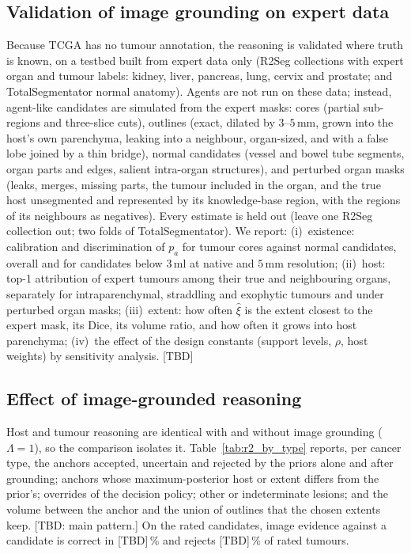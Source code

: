 \documentclass[fleqn,10pt]{olplainarticle}
\begin{document}
\subsection{Validation of image grounding on expert data}
\label{sec:results_expert}
Because TCGA has no tumour annotation, the reasoning is validated where truth is known, on a testbed built from expert
data only (R2Seg collections with expert organ and tumour labels: kidney, liver, pancreas, lung, cervix and prostate; and
TotalSegmentator normal anatomy). Agents are not run on these data; instead, agent-like candidates are simulated from the
expert masks: cores (partial sub-regions and three-slice cuts), outlines (exact, dilated by $3$--$5$\,mm, grown into the
host's own parenchyma, leaking into a neighbour, organ-sized, and with a false lobe joined by a thin bridge), normal
candidates (vessel and bowel tube segments, organ parts and edges, salient intra-organ structures), and perturbed organ
masks (leaks, merges, missing parts, the tumour included in the organ, and the true host unsegmented and represented by
its knowledge-base region, with the regions of its neighbours as negatives). Every estimate is held out (leave one R2Seg
collection out; two folds of TotalSegmentator). We report: (i)~existence: calibration and discrimination of $p_a$ for
tumour cores against normal candidates, overall and for candidates below $3$\,ml at native and $5$\,mm resolution;
(ii)~host: top-1 attribution of expert tumours among their true and neighbouring organs, separately for intraparenchymal,
straddling and exophytic tumours and under perturbed organ masks; (iii)~extent: how often $\hat\xi$ is the extent closest to
the expert mask, its Dice, its volume ratio, and how often it grows into host parenchyma; (iv)~the effect of the
design constants (support levels, $\rho$, host weights) by sensitivity analysis. [TBD]

\subsection{Effect of image-grounded reasoning}
\label{sec:results_r2}
Host and tumour reasoning are identical with and without image grounding ($\Lambda=1$), so the comparison isolates it.
Table~\ref{tab:r2_by_type} reports, per cancer type, the anchors accepted, uncertain and rejected by the priors alone and
after grounding; anchors whose maximum-posterior host or extent differs from the prior's; overrides of the decision policy;
other or indeterminate lesions; and the volume between the anchor and the union of outlines that the chosen extents keep. [TBD: main pattern.] On the rated candidates, image evidence against a
candidate is correct in [TBD]\,\% and rejects [TBD]\,\% of rated tumours.
\end{document}
